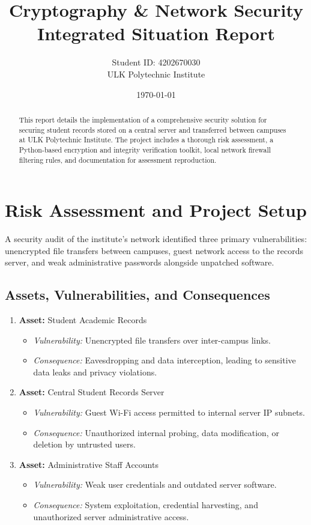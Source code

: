 \documentclass[12pt,a4paper]{article}
\title{\textbf{Cryptography \& Network Security Integrated Situation Report}}
\author{Student ID: 4202670030 \\ ULK Polytechnic Institute}
\date{\today}
\begin{document}
\maketitle

\begin{abstract}
This report details the implementation of a comprehensive security solution for securing student records stored on a central server and transferred between campuses at ULK Polytechnic Institute. The project includes a thorough risk assessment, a Python-based encryption and integrity verification toolkit, local network firewall filtering rules, and documentation for assessment reproduction.
\end{abstract}

\section{Risk Assessment and Project Setup}
A security audit of the institute's network identified three primary vulnerabilities: unencrypted file transfers between campuses, guest network access to the records server, and weak administrative passwords alongside unpatched software.

\subsection{Assets, Vulnerabilities, and Consequences}
\begin{enumerate}
    \item \textbf{Asset:} Student Academic Records
    \begin{itemize}
        \item \textit{Vulnerability:} Unencrypted file transfers over inter-campus links.
        \item \textit{Consequence:} Eavesdropping and data interception, leading to sensitive data leaks and privacy violations.
    \end{itemize}
    \item \textbf{Asset:} Central Student Records Server
    \begin{itemize}
        \item \textit{Vulnerability:} Guest Wi-Fi access permitted to internal server IP subnets.
        \item \textit{Consequence:} Unauthorized internal probing, data modification, or deletion by untrusted users.
    \end{itemize}
    \item \textbf{Asset:} Administrative Staff Accounts
    \begin{itemize}
        \item \textit{Vulnerability:} Weak user credentials and outdated server software.
        \item \textit{Consequence:} System exploitation, credential harvesting, and unauthorized server administrative access.
    \end{itemize}
\end{enumerate}
\end{document}
